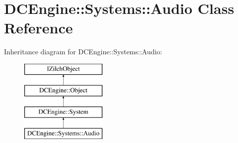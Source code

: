 \hypertarget{classDCEngine_1_1Systems_1_1Audio}{\section{D\-C\-Engine\-:\-:Systems\-:\-:Audio Class Reference}
\label{classDCEngine_1_1Systems_1_1Audio}
}
Inheritance diagram for D\-C\-Engine\-:\-:Systems\-:\-:Audio\-:\begin{figure}[H]
\begin{center}
\leavevmode
\includegraphics[height=4.000000cm]{classDCEngine_1_1Systems_1_1Audio}
\end{center}
\end{figure}
